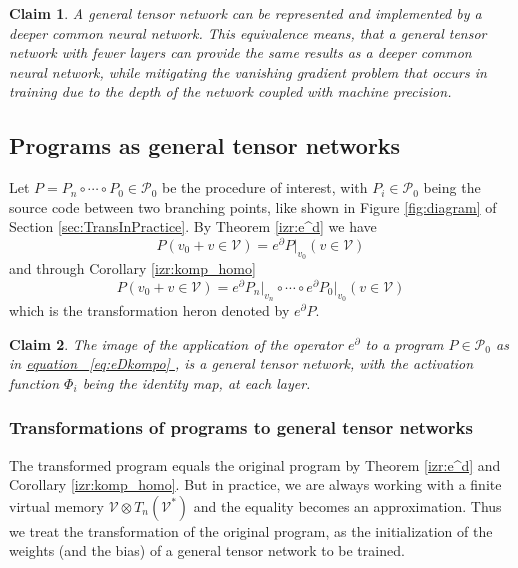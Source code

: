 \documentclass{article}
\makeatletter
\newcommand{\VV}{\mathcal{V}}
\newcommand{\dP}{\mathcal{P}}
\newcommand{\D}{\partial}
\newtheorem{trditev}{Claim}[section]
\let\originaleqref\eqref %
\renewcommand{\eqref}[1]{%
  \begingroup%
  \let\ref\@refstar%
  \hyperref[#1]{%
    equation%
    ~\originaleqref{#1}%
  }%
  \endgroup
}
\makeatother
\begin{document}
\begin{trditev}
A general tensor network can be represented and implemented by a deeper common neural network. This equivalence means, that a general tensor network with fewer layers can provide the same results as a deeper common neural network, while mitigating the vanishing gradient problem \cite{VanishingGradient} that occurs in training due to the depth of the network coupled with machine precision.
\end{trditev}

\subsection{Programs as general tensor networks}

Let $P=P_n\circ\cdots\circ P_0\in\dP_0$ be the procedure of interest, with $P_i\in\dP_0$ being the source code between two branching points, like shown in Figure \ref{fig:diagram} of Section \ref{sec:TransInPractice}.
By Theorem \ref{izr:e^d} we have
\begin{equation}
P(v_0+v\in \VV)=e^\D P\vert_{v_0}(v\in \VV)
\end{equation}
and through Corollary \ref{izr:komp_homo}
\begin{equation}\label{eq:eDkompo}
P(v_0+v\in \VV)=e^\D P_n\vert_{v_n}\circ\cdots \circ e^\D P_0\vert_{v_0}(v\in \VV)
\end{equation}
which is the transformation heron denoted by $e^\D P$.

\begin{trditev}
The image of the application of the operator $e^\D$ to a program $P\in\dP_0$ as in \eqref{eq:eDkompo}, is a general tensor network, with the activation function $\Phi_i$ being the identity map, at each layer.
\end{trditev}

\subsubsection{Transformations of programs to general tensor networks}

The transformed program equals the original program by Theorem \ref{izr:e^d} and Corollary \ref{izr:komp_homo}. But in practice, we are always working with a finite virtual memory $\VV\otimes T_n(\VV^*)$ and the equality becomes an approximation. Thus we treat the transformation of the original program, as the initialization of the weights (and the bias) of a general tensor network to be trained.  
\end{document}
